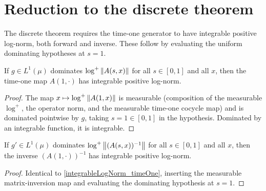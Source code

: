 \section{Reduction to the discrete theorem}

The discrete theorem requires the time-one generator to have integrable positive log-norm,
both forward and inverse. These follow by evaluating the uniform dominating hypotheses at
\( s = 1 \).

\begin{lemma}\label{integrableLogNorm_timeOne}
  \leanok
  If \( g \in L^1(\mu) \) dominates \( \log^{+}\left\lVert A(s,x) \right\rVert \) for all \( s \in [0,1] \) and all
  \( x \), then the time-one map \( A(1,\cdot) \) has integrable positive log-norm.
\end{lemma}
\begin{proof}\leanok
  The map \( x \mapsto \log^{+}\left\lVert A(1,x) \right\rVert \) is measurable (composition of the measurable
  \( \log^{+} \), the operator norm, and the measurable time-one cocycle map) and is dominated
  pointwise by \( g \), taking \( s = 1 \in [0,1] \) in the hypothesis. Dominated by an integrable
  function, it is integrable.
\end{proof}

\begin{lemma}\label{integrableLogNorm_timeOne_inv}
  \leanok
  If \( g' \in L^1(\mu) \) dominates \( \log^{+}\left\lVert (A(s,x))^{-1} \right\rVert \) for all \( s \in [0,1] \)
  and all \( x \), then the inverse \( (A(1,\cdot))^{-1} \) has integrable positive log-norm.
\end{lemma}
\begin{proof}\leanok
  Identical to \ref{integrableLogNorm_timeOne}, inserting the measurable matrix-inversion map
  and evaluating the dominating hypothesis at \( s = 1 \).
\end{proof}

